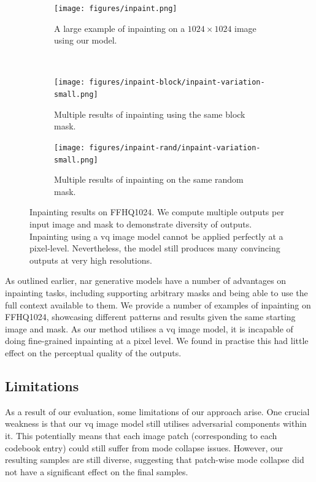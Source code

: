 \begin{figure}[h]
    \centering
    \begin{subfigure}[b]{\textwidth}
        \centering
        \label{fig:inpaintExample}
        \texttt{[image: figures/inpaint.png]}
        \caption{A large example of inpainting on a $1024 \times 1024$ image using our
        model.}
    \end{subfigure}
    \\
    \begin{subfigure}[b]{0.47\textwidth}
        \centering
        \texttt{[image: figures/inpaint-block/inpaint-variation-small.png]}
        \caption{
            Multiple results of inpainting using the same block mask.
        }
    \end{subfigure}
    \hfill
    \begin{subfigure}[b]{0.47\textwidth}
        \centering
        \texttt{[image: figures/inpaint-rand/inpaint-variation-small.png]}
        \caption{
            Multiple results of inpainting on the same random mask. 
        }
    \end{subfigure}
    \caption{
        Inpainting results on FFHQ1024. We compute multiple outputs per
        input image and mask to demonstrate diversity of outputs. Inpainting
        using a \gls{vq} image model cannot be applied perfectly at a
        pixel-level. Nevertheless, the model still produces many convincing
        outputs at very high resolutions.
    }
\end{figure}

As outlined earlier, \acrlong{nar} generative models have a number of advantages
on inpainting tasks, including supporting arbitrary masks and being able to use
the full context available to them. We provide a number of examples of
inpainting on FFHQ1024, showcasing different patterns and results given the same
starting image and mask. As our method utilises a \gls{vq} image model, it is
incapable of doing fine-grained inpainting at a pixel level. We found in
practise this had little effect on the perceptual quality of the outputs.

\subsection{Limitations}
\label{subsec:evaluationLimitation}

As a result of our evaluation, some limitations of our approach arise. One
crucial weakness is that our \gls{vq} image model still utilises adversarial
components within it. This potentially means that each image patch
(corresponding to each codebook entry) could still suffer from mode collapse
issues. However, our resulting samples are still diverse, suggesting that
patch-wise mode collapse did not have a significant effect on the final samples.


